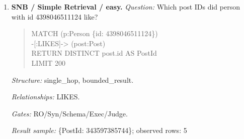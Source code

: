 \begin{enumerate}
\textit{Question:} How many posts are tagged 'Vietnam'?
\begin{quote}\scriptsize\ttfamily\raggedright\sloppy
MATCH (post:Post) -[:HAS\_TAG]-\textgreater{} (tag:Tag\\
\{name: 'Vietnam'\})\\
RETURN DISTINCT COUNT(DISTINCT post) AS\\
PostCount
\end{quote}
\textit{Structure:} single\_hop, aggregation.\par
\textit{Relationships:} HAS\_TAG.\par
\textit{Gates:} RO/Syn/Schema/Exec/Judge.\par
\textit{Result sample:} \{PostCount: 1\}; observed rows: 1
\item \textbf{SNB / Simple Retrieval / easy.}
\textit{Question:} Which post IDs did person with id 4398046511124 like?
\begin{quote}\scriptsize\ttfamily\raggedright\sloppy
MATCH (p:Person \{id: 4398046511124\})\\
-[:LIKES]-\textgreater{} (post:Post)\\
RETURN DISTINCT post.id AS PostId\\
LIMIT 200
\end{quote}
\textit{Structure:} single\_hop, bounded\_result.\par
\textit{Relationships:} LIKES.\par
\textit{Gates:} RO/Syn/Schema/Exec/Judge.\par
\textit{Result sample:} \{PostId: 343597385744\}; observed rows: 5
\end{enumerate}
